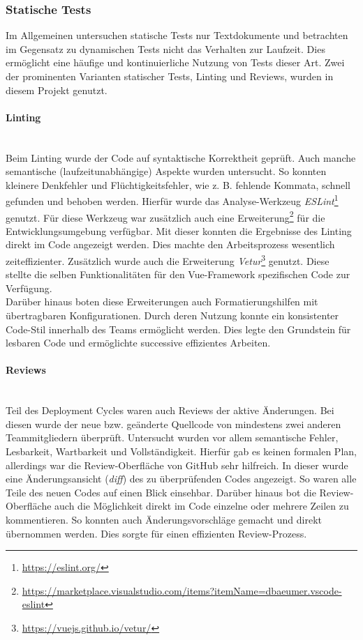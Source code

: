 \documentclass[10pt, a4paper]{article}
\begin{document}
\subsubsection*{Statische Tests}
Im Allgemeinen untersuchen statische Tests nur Textdokumente und betrachten im Gegensatz zu dynamischen Tests nicht das Verhalten zur Laufzeit.
Dies ermöglicht eine häufige und kontinuierliche Nutzung von Tests dieser Art.
Zwei der prominenten Varianten statischer Tests, Linting und Reviews, wurden in diesem Projekt genutzt.

\paragraph*{Linting}$~$ \\
Beim Linting wurde der Code auf syntaktische Korrektheit geprüft.
Auch manche semantische (laufzeitunabhängige) Aspekte wurden untersucht.
So konnten kleinere Denkfehler und Flüchtigkeitsfehler, wie z. B. fehlende Kommata, schnell gefunden und behoben werden.
Hierfür wurde das Analyse-Werkzeug \textit{ESLint}\footnote{\raggedright\url{https://eslint.org/}} genutzt.
Für diese Werkzeug war zusätzlich auch eine Erweiterung\footnote{\raggedright\url{https://marketplace.visualstudio.com/items?itemName=dbaeumer.vscode-eslint}} für die Entwicklungsumgebung verfügbar.
Mit dieser konnten die Ergebnisse des Linting direkt im Code angezeigt werden.
Dies machte den Arbeitsprozess wesentlich zeiteffizienter.
Zusätzlich wurde auch die Erweiterung \textit{Vetur}\footnote{\raggedright\url{https://vuejs.github.io/vetur/}} genutzt.
Diese stellte die selben Funktionalitäten für den Vue-Framework spezifischen Code zur Verfügung.
\\
Darüber hinaus boten diese Erweiterungen auch Formatierungshilfen mit übertragbaren Konfigurationen.
Durch deren Nutzung konnte ein konsistenter Code-Stil innerhalb des Teams ermöglicht werden.
Dies legte den Grundstein für lesbaren Code und ermöglichte successive effizientes Arbeiten.

\paragraph*{Reviews}$~$ \\
Teil des Deployment Cycles waren auch Reviews der aktive Änderungen.
Bei diesen wurde der neue bzw. geänderte Quellcode von mindestens zwei anderen Teammitgliedern überprüft.
Untersucht wurden vor allem semantische Fehler, Lesbarkeit, Wartbarkeit und Vollständigkeit.
Hierfür gab es keinen formalen Plan, allerdings war die Review-Oberfläche von GitHub sehr hilfreich.
In dieser wurde eine Änderungsansicht (\textit{diff}) des zu überprüfenden Codes angezeigt.
So waren alle Teile des neuen Codes auf einen Blick einsehbar.
Darüber hinaus bot die Review-Oberfläche auch die Möglichkeit direkt im Code einzelne oder mehrere Zeilen zu kommentieren.
So konnten auch Änderungsvorschläge gemacht und direkt übernommen werden.
Dies sorgte für einen effizienten Review-Prozess.
\end{document}
